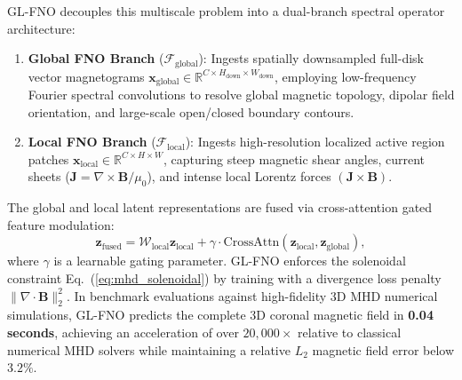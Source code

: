 GL-FNO decouples this multiscale problem into a dual-branch spectral operator architecture:
\begin{enumerate}
    \item \textbf{Global FNO Branch} ($\mathcal{F}_{\text{global}}$): Ingests spatially downsampled full-disk vector magnetograms $\mathbf{x}_{\text{global}} \in \mathbb{R}^{C \times H_{\text{down}} \times W_{\text{down}}}$, employing low-frequency Fourier spectral convolutions to resolve global magnetic topology, dipolar field orientation, and large-scale open/closed boundary contours.
    \item \textbf{Local FNO Branch} ($\mathcal{F}_{\text{local}}$): Ingests high-resolution localized active region patches $\mathbf{x}_{\text{local}} \in \mathbb{R}^{C \times H \times W}$, capturing steep magnetic shear angles, current sheets ($\mathbf{J} = \nabla \times \mathbf{B} / \mu_0$), and intense local Lorentz forces $(\mathbf{J} \times \mathbf{B})$.
\end{enumerate}
The global and local latent representations are fused via cross-attention gated feature modulation:
\begin{equation}
    \mathbf{z}_{\text{fused}} = \mathcal{W}_{\text{local}} \mathbf{z}_{\text{local}} + \gamma \cdot \text{CrossAttn}(\mathbf{z}_{\text{local}}, \mathbf{z}_{\text{global}}),
\end{equation}
where $\gamma$ is a learnable gating parameter. GL-FNO enforces the solenoidal constraint Eq.~(\ref{eq:mhd_solenoidal}) by training with a divergence loss penalty $\|\nabla \cdot \mathbf{B}\|_2^2$. In benchmark evaluations against high-fidelity 3D MHD numerical simulations, GL-FNO predicts the complete 3D coronal magnetic field in \textbf{0.04 seconds}, achieving an acceleration of over \textbf{$20{,}000\times$} relative to classical numerical MHD solvers while maintaining a relative $L_2$ magnetic field error below $3.2\%$.

